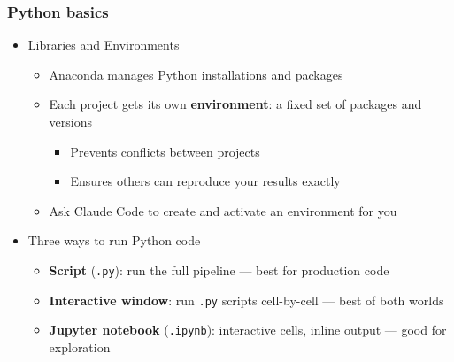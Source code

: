 \documentclass[aspectratio=169, 12pt]{beamer}
\begin{document}
\begin{frame}
\frametitle{Python basics}
\begin{itemize}
    \item Libraries and Environments
    \begin{itemize}
        \item Anaconda manages Python installations and packages
        \item Each project gets its own \textbf{environment}: a fixed set of packages and versions
            \begin{itemize}
                \item[$\circ$] Prevents conflicts between projects
                \item[$\circ$] Ensures others can reproduce your results exactly
            \end{itemize}
        \item Ask Claude Code to create and activate an environment for you
    \end{itemize}

    \item Three ways to run Python code
        \begin{itemize}
            \item[$\circ$] \textbf{Script} (\texttt{.py}): run the full pipeline --- best for production code
            \item[$\circ$] \textbf{Interactive window}: run \texttt{.py} scripts cell-by-cell --- best of both worlds
            \item[$\circ$] \textbf{Jupyter notebook} (\texttt{.ipynb}): interactive cells, inline output --- good for exploration
        \end{itemize}
\end{itemize}
\end{frame}
\end{document}
